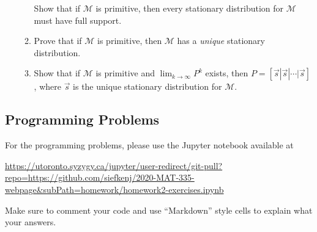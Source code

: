 \documentclass[letter]{article}
\begin{document}
\begin{enumerate}
\begin{enumerate}
				\smallskip
				Show that if $\mathcal M$ is primitive, then every stationary distribution for $\mathcal M$
				must have full support.
			\item Prove that if $\mathcal M$ is primitive, then $\mathcal M$ has a \emph{unique} stationary distribution.
			\item Show that if $\mathcal M$ is primitive and $\lim_{k\to\infty} P^k$ exists, then $P=[\vec s|\vec s|\cdots|\vec s]$,
				where $\vec s$ is the unique stationary distribution for $\mathcal M$.
		\end{enumerate}


	\end{enumerate}


	\subsection*{Programming Problems}
	For the programming problems, please use the Jupyter notebook available at

	\url{https://utoronto.syzygy.ca/jupyter/user-redirect/git-pull?repo=https://github.com/siefkenj/2020-MAT-335-webpage&subPath=homework/homework2-exercises.ipynb}

	Make sure to comment your code and use ``Markdown'' style cells to explain what your answers.
\end{document}
